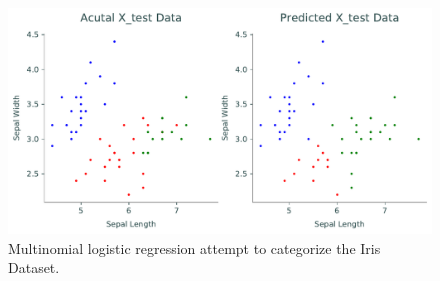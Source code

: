 \begin{figure}[H]
    \includegraphics[width=.9\textwidth]{figures/plot_iris.pdf}
    \caption{Multinomial logistic regression attempt to categorize the Iris Dataset.}
    \label{fig:iris}
\end{figure}
